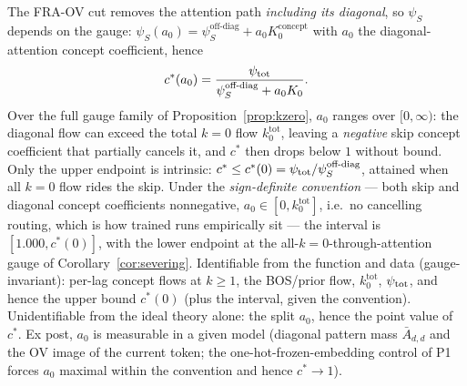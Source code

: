 \documentclass{article}
\begin{document}
\begin{corollary}\label{cor:gaugecstar}
The FRA-OV cut removes the attention path \emph{including its diagonal}, so $\psi_S$ depends on the gauge: $\psi_S(a_0) = \psi_S^{\text{off-diag}} + a_0 K_0^{\text{concept}}$ with $a_0$ the diagonal-attention concept coefficient, hence
\begin{equation}
    c^*(a_0) = \frac{\psi_{\mathrm{tot}}}{\psi_S^{\text{off-diag}} + a_0 K_0} .
\end{equation}
Over the full gauge family of Proposition~\ref{prop:kzero}, $a_0$ ranges over $[0, \infty)$: the diagonal flow can exceed the total $k = 0$ flow $k_0^{\mathrm{tot}}$, leaving a \emph{negative} skip concept coefficient that partially cancels it, and $c^*$ then drops below $1$ without bound. Only the upper endpoint is intrinsic: $c^* \le c^*(0) = \psi_{\mathrm{tot}}/\psi_S^{\text{off-diag}}$, attained when all $k = 0$ flow rides the skip. Under the \emph{sign-definite convention} --- both skip and diagonal concept coefficients nonnegative, $a_0 \in [0, k_0^{\mathrm{tot}}]$, i.e.\ no cancelling routing, which is how trained runs empirically sit --- the interval is $[1.000, c^*(0)]$, with the lower endpoint at the all-$k{=}0$-through-attention gauge of Corollary~\ref{cor:severing}. Identifiable from the function and data (gauge-invariant): per-lag concept flows at $k \ge 1$, the BOS/prior flow, $k_0^{\mathrm{tot}}$, $\psi_{\mathrm{tot}}$, and hence the upper bound $c^*(0)$ (plus the interval, given the convention). Unidentifiable from the ideal theory alone: the split $a_0$, hence the point value of $c^*$. Ex post, $a_0$ is measurable in a given model (diagonal pattern mass $\bar A_{d,d}$ and the OV image of the current token; the one-hot-frozen-embedding control of P1 forces $a_0$ maximal within the convention and hence $c^* \to 1$).
\end{corollary}
\end{document}
